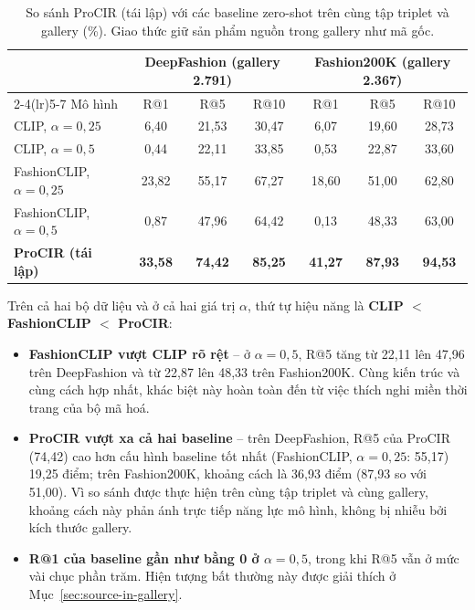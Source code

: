 \begin{table}[h]
\centering
\caption{So sánh ProCIR (tái lập) với các baseline zero-shot trên cùng tập triplet và gallery (\%). Giao thức giữ sản phẩm nguồn trong gallery như mã gốc.}
\label{tab:baseline}
\begin{tabular}{lcccccc}
\toprule
& \multicolumn{3}{c}{DeepFashion (gallery 2.791)} & \multicolumn{3}{c}{Fashion200K (gallery 2.367)} \\
\cmidrule(lr){2-4}\cmidrule(lr){5-7}
Mô hình & R@1 & R@5 & R@10 & R@1 & R@5 & R@10 \\
\midrule
CLIP, $\alpha = 0{,}25$       & 6,40 & 21,53 & 30,47 & 6,07 & 19,60 & 28,73 \\
CLIP, $\alpha = 0{,}5$        & 0,44 & 22,11 & 33,85 & 0,53 & 22,87 & 33,60 \\
FashionCLIP, $\alpha = 0{,}25$ & 23,82 & 55,17 & 67,27 & 18,60 & 51,00 & 62,80 \\
FashionCLIP, $\alpha = 0{,}5$ & 0,87 & 47,96 & 64,42 & 0,13 & 48,33 & 63,00 \\
\midrule
\textbf{ProCIR (tái lập)} & \textbf{33,58} & \textbf{74,42} & \textbf{85,25} & \textbf{41,27} & \textbf{87,93} & \textbf{94,53} \\
\bottomrule
\end{tabular}
\end{table}

Trên cả hai bộ dữ liệu và ở cả hai giá trị $\alpha$, thứ tự hiệu năng là \textbf{CLIP $<$ FashionCLIP $<$ ProCIR}:
\begin{itemize}
    \item \textbf{FashionCLIP vượt CLIP rõ rệt} -- ở $\alpha = 0{,}5$, R@5 tăng từ 22,11 lên 47,96 trên DeepFashion và từ 22,87 lên 48,33 trên Fashion200K. Cùng kiến trúc và cùng cách hợp nhất, khác biệt này hoàn toàn đến từ việc thích nghi miền thời trang của bộ mã hoá.
    \item \textbf{ProCIR vượt xa cả hai baseline} -- trên DeepFashion, R@5 của ProCIR (74,42) cao hơn cấu hình baseline tốt nhất (FashionCLIP, $\alpha = 0{,}25$: 55,17) 19,25 điểm; trên Fashion200K, khoảng cách là 36,93 điểm (87,93 so với 51,00). Vì so sánh được thực hiện trên cùng tập triplet và cùng gallery, khoảng cách này phản ánh trực tiếp năng lực mô hình, không bị nhiễu bởi kích thước gallery.
    \item \textbf{R@1 của baseline gần như bằng 0 ở $\alpha = 0{,}5$}, trong khi R@5 vẫn ở mức vài chục phần trăm. Hiện tượng bất thường này được giải thích ở Mục~\ref{sec:source-in-gallery}.
\end{itemize}

